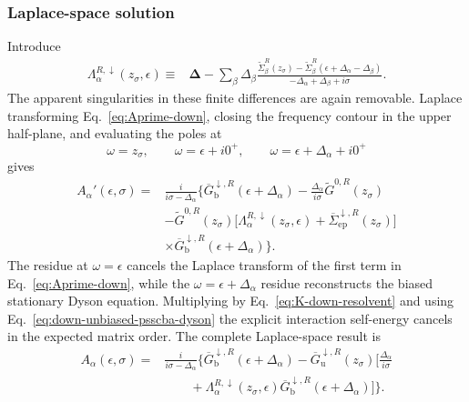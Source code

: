 \documentclass[
 reprint,
 superscriptaddress,
 amsmath,amssymb,
 aps,prb,
 longbibliography,
 floatfix
]{revtex4-2}
\newcommand{\ep}{\mathrm{ep}}
\newcommand{\barSigma}{\overline{\Sigma}}
\begin{document}
\subsubsection{Laplace-space solution}

Introduce
\begin{equation*}
\begin{aligned}
\Lambda_\alpha^{R,\downarrow}
(z_\sigma,\epsilon)
\equiv{}&
\bm\Delta
-
\sum_\beta
\Delta_\beta
\frac{
\widetilde\Sigma_\beta^R(z_\sigma)
-
\widetilde\Sigma_\beta^R
(\epsilon+\Delta_\alpha-\Delta_\beta)}
{
-\Delta_\alpha+\Delta_\beta+i\sigma
}.
\end{aligned}
\end{equation*}
The apparent singularities in these finite differences are again removable. Laplace transforming Eq.~\eqref{eq:Aprime-down}, closing the frequency contour in the upper half-plane, and evaluating the poles at
\begin{equation*}
\omega=z_\sigma,\qquad
\omega=\epsilon+i0^+,\qquad
\omega=\epsilon+\Delta_\alpha+i0^+
\end{equation*}
gives
\begin{equation*}
\begin{aligned}
A_\alpha'(\epsilon,\sigma)
={}&
\frac{i}{i\sigma-\Delta_\alpha}
\Bigg\{
\overline G_{\mathrm b}^{\downarrow,R}
(\epsilon+\Delta_\alpha)
-
\frac{\Delta_\alpha}{i\sigma}
\widetilde G^{0,R}(z_\sigma)
\\
&-
\widetilde G^{0,R}(z_\sigma)
\Big[
\Lambda_\alpha^{R,\downarrow}
(z_\sigma,\epsilon)
+
\barSigma_{\ep}^{\downarrow,R}(z_\sigma)
\Big]
\\
&\times
\overline G_{\mathrm b}^{\downarrow,R}
(\epsilon+\Delta_\alpha)
\Bigg\}.
\end{aligned}
\end{equation*}
The residue at $\omega=\epsilon$ cancels the Laplace transform of the first term in Eq.~\eqref{eq:Aprime-down}, while the $\omega=\epsilon+\Delta_\alpha$ residue reconstructs the biased stationary Dyson equation. Multiplying by Eq.~\eqref{eq:K-down-resolvent} and using Eq.~\eqref{eq:down-unbiased-psscba-dyson} the explicit interaction self-energy cancels in the expected matrix order. The complete Laplace-space result is
\begin{equation*}
\begin{aligned}
A_\alpha(\epsilon,\sigma)
={}&
\frac{i}{i\sigma-\Delta_\alpha}
\Bigg\{
\overline G_{\mathrm b}^{\downarrow,R}
(\epsilon+\Delta_\alpha) -
\overline G_{\mathrm u}^{\downarrow,R}
(z_\sigma)
\Bigg[
\frac{\Delta_\alpha}{i\sigma}
\\
&\qquad+
\Lambda_\alpha^{R,\downarrow}
(z_\sigma,\epsilon)
\overline G_{\mathrm b}^{\downarrow,R}
(\epsilon+\Delta_\alpha)
\Bigg]
\Bigg\}.
\end{aligned}
\end{equation*}
\end{document}
